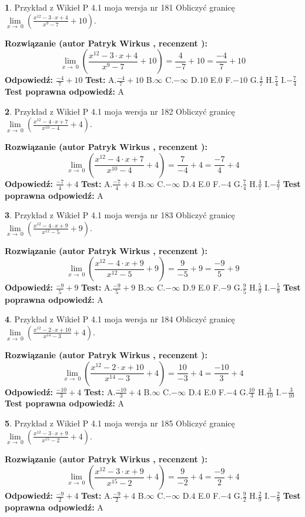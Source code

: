 \documentclass[12pt, a4paper]{article}
\theoremstyle{definition} %
\newtheorem{zad}{}
\newcommand{\zadStart}[1]{\begin{zad}#1\newline}
\newcommand{\zadStop}{\end{zad}}
\newcommand{\rozwStart}[2]{\noindent \textbf{Rozwiązanie (autor #1 , recenzent #2): }\newline}
\newcommand{\rozwStop}{\newline}
\newcommand{\odpStart}{\noindent \textbf{Odpowiedź:}\newline}
\newcommand{\odpStop}{\newline}
\newcommand{\testStart}{\noindent \textbf{Test:}\newline}
\newcommand{\testStop}{\newline}
\newcommand{\kluczStart}{\noindent \textbf{Test poprawna odpowiedź:}\newline}
\newcommand{\kluczStop}{\newline}
\begin{document}
\zadStart{Przykład z Wikieł P 4.1 moja wersja nr 181}
Obliczyć granicę $\lim\limits_{x\to\ 0}(\frac{x^{12}-3 \cdot x +4}{x^{9}-7}+10)$.
\zadStop
\rozwStart{Patryk Wirkus}{}
$$\lim\limits_{x\to\ 0}(\frac{x^{12}-3 \cdot x +4}{x^{9}-7}+10)=\frac{4}{-7}+10=\frac{-4}{7}+10$$
\rozwStop
\odpStart
$\frac{-4}{7}+10$
\odpStop
\testStart
A.$\frac{-4}{7}+10$
B.$\infty$
C.$-\infty$
D.$10$
E.$0$
F.$-10$
G.$\frac{4}{7}$
H.$\frac{7}{4}$
I.$-\frac{7}{4}$
\testStop
\kluczStart
A
\kluczStop



\zadStart{Przykład z Wikieł P 4.1 moja wersja nr 182}
Obliczyć granicę $\lim\limits_{x\to\ 0}(\frac{x^{12}-4 \cdot x +7}{x^{10}-4}+4)$.
\zadStop
\rozwStart{Patryk Wirkus}{}
$$\lim\limits_{x\to\ 0}(\frac{x^{12}-4 \cdot x +7}{x^{10}-4}+4)=\frac{7}{-4}+4=\frac{-7}{4}+4$$
\rozwStop
\odpStart
$\frac{-7}{4}+4$
\odpStop
\testStart
A.$\frac{-7}{4}+4$
B.$\infty$
C.$-\infty$
D.$4$
E.$0$
F.$-4$
G.$\frac{7}{4}$
H.$\frac{4}{7}$
I.$-\frac{4}{7}$
\testStop
\kluczStart
A
\kluczStop



\zadStart{Przykład z Wikieł P 4.1 moja wersja nr 183}
Obliczyć granicę $\lim\limits_{x\to\ 0}(\frac{x^{12}-4 \cdot x +9}{x^{12}-5}+9)$.
\zadStop
\rozwStart{Patryk Wirkus}{}
$$\lim\limits_{x\to\ 0}(\frac{x^{12}-4 \cdot x +9}{x^{12}-5}+9)=\frac{9}{-5}+9=\frac{-9}{5}+9$$
\rozwStop
\odpStart
$\frac{-9}{5}+9$
\odpStop
\testStart
A.$\frac{-9}{5}+9$
B.$\infty$
C.$-\infty$
D.$9$
E.$0$
F.$-9$
G.$\frac{9}{5}$
H.$\frac{5}{9}$
I.$-\frac{5}{9}$
\testStop
\kluczStart
A
\kluczStop



\zadStart{Przykład z Wikieł P 4.1 moja wersja nr 184}
Obliczyć granicę $\lim\limits_{x\to\ 0}(\frac{x^{12}-2 \cdot x +10}{x^{14}-3}+4)$.
\zadStop
\rozwStart{Patryk Wirkus}{}
$$\lim\limits_{x\to\ 0}(\frac{x^{12}-2 \cdot x +10}{x^{14}-3}+4)=\frac{10}{-3}+4=\frac{-10}{3}+4$$
\rozwStop
\odpStart
$\frac{-10}{3}+4$
\odpStop
\testStart
A.$\frac{-10}{3}+4$
B.$\infty$
C.$-\infty$
D.$4$
E.$0$
F.$-4$
G.$\frac{10}{3}$
H.$\frac{3}{10}$
I.$-\frac{3}{10}$
\testStop
\kluczStart
A
\kluczStop



\zadStart{Przykład z Wikieł P 4.1 moja wersja nr 185}
Obliczyć granicę $\lim\limits_{x\to\ 0}(\frac{x^{12}-3 \cdot x +9}{x^{15}-2}+4)$.
\zadStop
\rozwStart{Patryk Wirkus}{}
$$\lim\limits_{x\to\ 0}(\frac{x^{12}-3 \cdot x +9}{x^{15}-2}+4)=\frac{9}{-2}+4=\frac{-9}{2}+4$$
\rozwStop
\odpStart
$\frac{-9}{2}+4$
\odpStop
\testStart
A.$\frac{-9}{2}+4$
B.$\infty$
C.$-\infty$
D.$4$
E.$0$
F.$-4$
G.$\frac{9}{2}$
H.$\frac{2}{9}$
I.$-\frac{2}{9}$
\testStop
\kluczStart
A
\kluczStop
\end{document}
